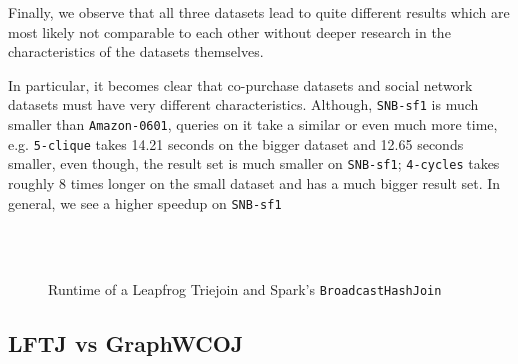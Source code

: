 Finally, we observe that all three datasets lead to quite different results which are most likely not comparable to each other without deeper research
in the characteristics of the datasets themselves.

In particular, it becomes clear that co-purchase datasets and social network datasets must have very different characteristics.
Although, \texttt{SNB-sf1} is much smaller than \texttt{Amazon-0601}, queries on it take a similar or even much more time,
e.g. \texttt{5-clique} takes 14.21 seconds on the bigger dataset and 12.65 seconds smaller, even though, the result set is much
smaller on \texttt{SNB-sf1};
\texttt{4-cycles} takes roughly 8 times longer on the small dataset and has a much bigger result set.
In general, we see a higher speedup on \texttt{SNB-sf1}

\begin{figure}
    \centering
    \subfloat[Amazon0302]{
    
    
    }\\
    \subfloat[Amazon0601]{
    
    
    }\\
    \subfloat[SNB-sf-1]{
    
    
    }
    \caption{Runtime of a Leapfrog Triejoin and Spark's \texttt{BroadcastHashJoin}}
    \label{fig:spark-vs-lftj}
\end{figure}


%
%    
%
%    
%
%    

\subsection{\textsc{LFTJ} vs GraphWCOJ} \label{subsec:lftj-vs-graphWCOJ}

